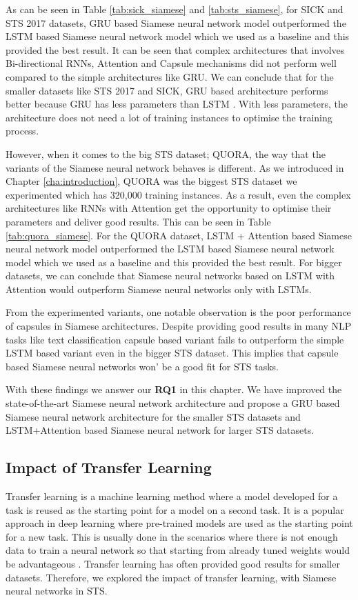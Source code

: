 As can be seen in Table \ref{tab:sick_siamese} and \ref{tab:sts_siamese}, for SICK and STS 2017 datasets, GRU based Siamese neural network model outperformed the LSTM based Siamese neural network model which we used as a baseline and this provided the best result. It can be seen that complex architectures that involves Bi-directional RNNs, Attention and Capsule mechanisms did not perform well compared to the simple architectures like GRU. We can conclude that for the smaller datasets like STS 2017 and SICK, GRU based architecture performs better because GRU has less parameters than LSTM \cite{Chung2014EmpiricalEO}. With less parameters, the architecture does not need a lot of training instances to optimise the training process.

However, when it comes to the big STS dataset; QUORA, the way that the variants of the Siamese neural network behaves is different. As we introduced in Chapter \ref{cha:introduction}, QUORA was the biggest STS dataset we experimented which has 320,000 training instances. As a result, even the complex architectures like RNNs with Attention get the opportunity to optimise their parameters and deliver good results. This can be seen in Table \ref{tab:quora_siamese}. For the QUORA dataset, LSTM + Attention based Siamese neural network model outperformed the LSTM based Siamese neural network model which we used as a baseline and this provided the best result. For bigger datasets, we can conclude that Siamese neural networks based on LSTM with Attention would outperform Siamese neural networks only with LSTMs. 

From the experimented variants, one notable observation is the poor performance of capsules in Siamese architectures. Despite providing good results in many NLP tasks like text classification \cite{NIPS2017_2cad8fa4,hettiarachchi-ranasinghe-2019-emoji} capsule based variant fails to outperform the simple LSTM based variant even in the bigger STS dataset. This implies that capsule based Siamese neural networks won' be a good fit for STS tasks.

With these findings we answer our \textbf{RQ1} in this chapter. We have improved the state-of-the-art Siamese neural network architecture and propose a GRU based Siamese neural network architecture for the smaller STS datasets and LSTM+Attention based Siamese neural network for larger STS datasets.

			
\subsection{Impact of Transfer Learning}
\label{sec:siamese_transfer}
Transfer learning is a machine learning method where a model developed for a task is reused as the starting point for a model on a second task. It is a popular approach in deep learning where pre-trained models are used as the starting point for a new task. This is usually done in the scenarios where there is not enough data to train a neural network so that starting from already tuned weights would be advantageous \cite{pmlr-v97-houlsby19a, ruder-etal-2019-transfer}. Transfer learning has often provided good results for smaller datasets. Therefore, we explored the impact of transfer learning, with Siamese neural networks in STS. 

